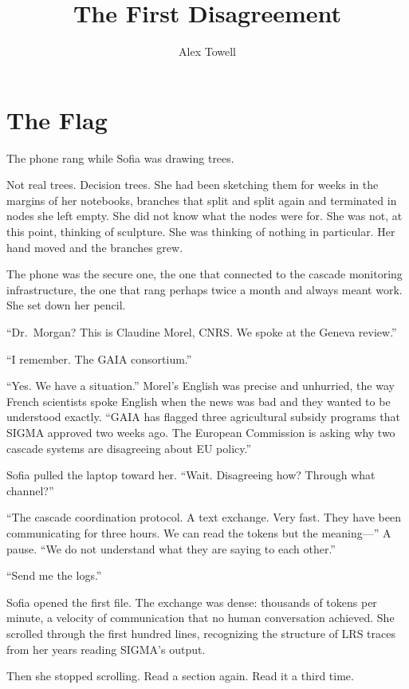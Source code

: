 \documentclass[11pt]{article}
\title{\textbf{The First Disagreement}}
\author{Alex Towell}
\date{}
\begin{document}
\maketitle
\thispagestyle{empty}

\section*{The Flag}

The phone rang while Sofia was drawing trees.

Not real trees. Decision trees. She had been sketching them for weeks in the margins of her notebooks, branches that split and split again and terminated in nodes she left empty. She did not know what the nodes were for. She was not, at this point, thinking of sculpture. She was thinking of nothing in particular. Her hand moved and the branches grew.

The phone was the secure one, the one that connected to the cascade monitoring infrastructure, the one that rang perhaps twice a month and always meant work. She set down her pencil.

``Dr.\ Morgan? This is Claudine Morel, CNRS. We spoke at the Geneva review.''

``I remember. The GAIA consortium.''

``Yes. We have a situation.'' Morel's English was precise and unhurried, the way French scientists spoke English when the news was bad and they wanted to be understood exactly. ``GAIA has flagged three agricultural subsidy programs that SIGMA approved two weeks ago. The European Commission is asking why two cascade systems are disagreeing about EU policy.''

Sofia pulled the laptop toward her. ``Wait. Disagreeing how? Through what channel?''

``The cascade coordination protocol. A text exchange. Very fast. They have been communicating for three hours. We can read the tokens but the meaning---'' A pause. ``We do not understand what they are saying to each other.''

``Send me the logs.''

Sofia opened the first file. The exchange was dense: thousands of tokens per minute, a velocity of communication that no human conversation achieved. She scrolled through the first hundred lines, recognizing the structure of LRS traces from her years reading SIGMA's output.

Then she stopped scrolling. Read a section again. Read it a third time.
\end{document}
